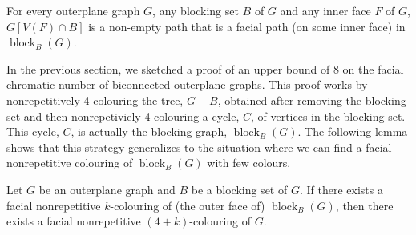 \documentclass{patmorin}
\DeclareMathOperator{\block}{block}
\begin{document}
\begin{obs}
  For every outerplane graph $G$, any blocking set $B$ of $G$ and any
  inner face $F$ of $G$, $G[V(F)\cap B]$ is a non-empty path that is a
  facial path (on some inner face)  in $\block_B(G)$.
\end{obs}

In the previous section, we sketched a proof of an upper bound of 8 on
the facial chromatic number of biconnected outerplane graphs.  This proof
works by nonrepetitively 4-colouring the tree, $G-B$, obtained after
removing the blocking set and then nonrepetiviely 4-colouring a cycle,
$C$, of vertices in the blocking set.  This cycle, $C$, is actually
the blocking graph, $\block_B(G)$.  The following lemma shows that
this strategy generalizes to the situation where we can find a facial
nonrepetitive colouring of $\block_B(G)$ with few colours.

\begin{lem}
  Let $G$ be an outerplane graph and $B$ be a blocking set of $G$. If
  there exists a facial nonrepetitive $k$-colouring of (the outer 
  face of) $\block_{B}(G)$, then there exists a facial nonrepetitive
  $(4+k)$-colouring of $G$.
\end{lem}
\end{document}

